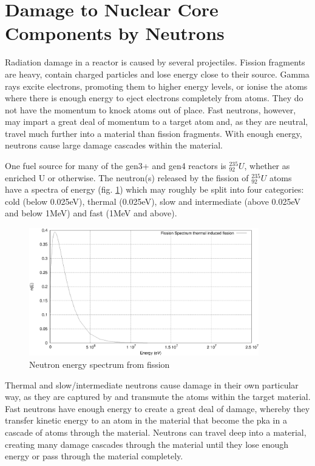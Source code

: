 \FloatBarrier
\section{Damage to Nuclear Core Components by Neutrons}

Radiation damage in a reactor is caused by several projectiles.  Fission fragments are heavy, contain charged particles and lose energy close to their source.  Gamma rays excite electrons, promoting them to higher energy levels, or ionise the atoms where there is enough energy to eject electrons completely from atoms.  They do not have the momentum to knock atoms out of place.  Fast neutrons, however, may impart a great deal of momentum to a target atom and, as they are neutral, travel much further into a material than fission fragments.  With enough energy, neutrons cause large damage cascades within the material.

One fuel source for many of the \acrshort{gen3+} and \acrshort{gen4} reactors is ${}^{235}_{92}U$, whether as enriched U or otherwise.  The neutron(s) released by the fission of ${}^{235}_{92}U$ atoms have a spectra of energy (fig. \ref{fig:neutronfissionspectra}) which may roughly be split into four categories: cold (below 0.025eV), thermal (0.025eV), slow and intermediate (above 0.025eV and below 1MeV) and fast (1MeV and above).

\begin{figure}[htbp]
  \begin{center}
    \includegraphics[width=10.0cm]{chapters/introduction/plots/fission_spectra/fission_spectra.eps}
    \caption{Neutron energy spectrum from fission\cite{jeff311}}
    \label{fig:neutronfissionspectra}
  \end{center}
\end{figure}

Thermal and slow/intermediate neutrons cause damage in their own particular way, as they are captured by and transmute the atoms within the target material.  Fast neutrons have enough energy to create a great deal of damage, whereby they transfer kinetic energy to an atom in the material that become the \acrfull{pka} in a cascade of atoms through the material.  Neutrons can travel deep into a material, creating many damage cascades through the material until they lose enough  energy or pass through the material completely.


